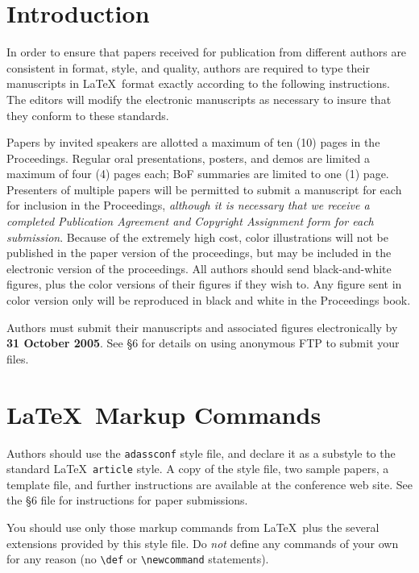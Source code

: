 \documentclass[11pt,twoside]{article}
\def\emphasize#1{{\sl#1\/}}
\begin{document}
\setcounter{footnote}{1}

\section{Introduction}

In order to ensure that papers received for publication from different
authors are consistent in format, style, and quality, authors are
required to type their manuscripts in \LaTeX\ format exactly according
to the following instructions.  The editors will modify the electronic
manuscripts as necessary to insure that they conform to these
standards.

Papers by invited speakers are allotted a maximum of ten (10) pages
in the Proceedings. Regular oral presentations, posters, and demos are
limited a maximum of four (4) pages each; BoF summaries are limited to one
(1) page.  Presenters of multiple papers will be permitted to submit a
manuscript for each for inclusion in the Proceedings, \emph{although
it is necessary that we receive a completed Publication Agreement
and Copyright Assignment form for each submission}.  Because of the
extremely high cost, color illustrations will not be published in the
paper version of the proceedings, but may be included in the electronic
version  of the proceedings. All authors should send black-and-white
figures, plus the color versions of their figures if they wish to.
Any figure sent in color version only will be reproduced in black and
white in the Proceedings book.

Authors must submit their manuscripts and associated figures
electronically by {\bf 31 October 2005}. See  
\S 6
for details on using anonymous FTP to submit your files.  

\section{\LaTeX\ Markup Commands}

Authors should use the \verb+adassconf+ style file, and declare it as
a substyle to the standard \LaTeX\ \verb+article+ style.  A copy of
the style file, two sample papers, a template file, and further
instructions are available at the conference web site.  See the 
\S 6
file for instructions for paper submissions.

You should use only those markup commands from \LaTeX\ plus the several
extensions provided by this style file.  Do \emphasize{not} define any
commands of your own for any reason (no \verb+\def+ or \verb+\newcommand+
statements).
\end{document}
